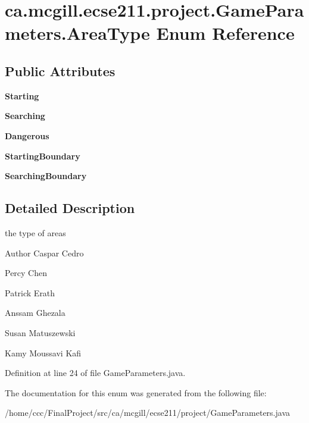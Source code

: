 \hypertarget{enumca_1_1mcgill_1_1ecse211_1_1project_1_1_game_parameters_1_1_area_type}{}\section{ca.\+mcgill.\+ecse211.\+project.\+Game\+Parameters.\+Area\+Type Enum Reference}
\label{enumca_1_1mcgill_1_1ecse211_1_1project_1_1_game_parameters_1_1_area_type}
\subsection*{Public Attributes}
\begin{DoxyCompactItemize}
\item 
\mbox{\label{enumca_1_1mcgill_1_1ecse211_1_1project_1_1_game_parameters_1_1_area_type_a3e0e6dda84dcf0572039c349889217c5}} 
{\bfseries Starting}
\item 
\mbox{\label{enumca_1_1mcgill_1_1ecse211_1_1project_1_1_game_parameters_1_1_area_type_a25564076fdd8880377fbd6eaf753456f}} 
{\bfseries Searching}
\item 
\mbox{\label{enumca_1_1mcgill_1_1ecse211_1_1project_1_1_game_parameters_1_1_area_type_ac762256f8b33e7c93c162520a0349769}} 
{\bfseries Dangerous}
\item 
\mbox{\label{enumca_1_1mcgill_1_1ecse211_1_1project_1_1_game_parameters_1_1_area_type_afd78c1184c6b82e22bb08ed39ae4e83b}} 
{\bfseries Starting\+Boundary}
\item 
\mbox{\label{enumca_1_1mcgill_1_1ecse211_1_1project_1_1_game_parameters_1_1_area_type_a5a3aceb665ba97ac242e77955feed640}} 
{\bfseries Searching\+Boundary}
\end{DoxyCompactItemize}


\subsection{Detailed Description}
the type of areas \begin{DoxyAuthor}{Author}
Caspar Cedro 

Percy Chen 

Patrick Erath 

Anssam Ghezala 

Susan Matuszewski 

Kamy Moussavi Kafi 
\end{DoxyAuthor}


Definition at line 24 of file Game\+Parameters.\+java.



The documentation for this enum was generated from the following file\+:\begin{DoxyCompactItemize}
\item 
/home/ccc/\+Final\+Project/src/ca/mcgill/ecse211/project/Game\+Parameters.\+java\end{DoxyCompactItemize}
